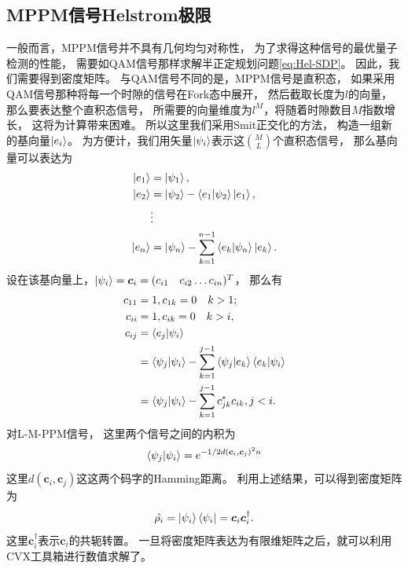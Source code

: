 \subsection{MPPM信号Helstrom极限}
一般而言，MPPM信号并不具有几何均匀对称性，
为了求得这种信号的最优量子检测的性能，
需要如QAM信号那样求解半正定规划问题\ref{eq:Hel-SDP}。
因此，我们需要得到密度矩阵。
与QAM信号不同的是，MPPM信号是直积态，
如果采用QAM信号那种将每一个时隙的信号在Fork态中展开，
然后截取长度为$l$的向量，那么要表达整个直积态信号，
所需要的向量维度为$l^M$，将随着时隙数目$M$指数增长，
这将为计算带来困难。
所以这里我们采用Smit正交化的方法\cite{lzw2010LA,zyh2007szjsff}，
构造一组新的基向量$\ket{e_i}$。
为方便计，我们用矢量$\ket{\psi_i}$表示这$\binom{M}{L}$个直积态信号，
那么基向量可以表达为
\begin{equation}
\begin{split}
\ket{e_1} &= \ket{\psi_1}, \\
\ket{e_2} &= \ket{\psi_2} - \bra{e_1}\ket{\psi_2}\ket{e_1}, \\
          &\vdots \\
\ket{e_n} &= \ket{\psi_n} - \sum_{k=1}^{n-1} \bra{e_k}\ket{\psi_n}\ket{e_k}.
\end{split}
\end{equation}
设在该基向量上，$\ket{\psi_i} =\bm{c}_i = (c_{i1} \quad c_{i2} \dots c_{in})^T$，
那么有
\begin{equation}
\begin{split}
c_{11} &= 1, c_{1k}=0 \quad k>1; \\
c_{ii} &= 1, c_{ik}=0 \quad k>i, \\
c_{ij} &= \bra{e_j}\ket{\psi_i} \\
       &= \bra{\psi_j}\ket{\psi_i} - \sum_{k=1}^{j-1} \bra{\psi_j}\ket{e_k} \bra{e_k}\ket{\psi_i} \\
       &= \bra{\psi_j}\ket{\psi_i} - \sum_{k=1}^{j-1} c_{jk}^* c_{ik}, j<i.
\end{split}
\end{equation}
对L-M-PPM信号，
这里两个信号之间的内积为
\begin{equation}
\bra{\psi_j}\ket{\psi_i}=e^{-1/2 d(\bm{c}_i, \bm{c}_j)^2 n}
\end{equation}
这里$d(\bm{c}_i, \bm{c}_j)$这这两个码字的Hamming距离。
利用上述结果，可以得到密度矩阵为
\begin{equation}
\hat{\rho_i} = \ket{\psi_i}\bra{\psi_i} = \bm{c}_i \bm{c}_i^\dagger.
\end{equation}
这里$\bm{c}_i^\dagger$表示$\bm{c}_i$的共轭转置。
一旦将密度矩阵表达为有限维矩阵之后，就可以利用CVX工具箱\cite{cvx,gb08}进行数值求解了。



